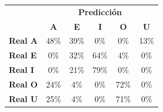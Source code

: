 \begin{tabular}{lccccc}
\toprule
 & \multicolumn{5}{c}{\textbf{Predicción}} \\
 & \textbf{A} & \textbf{E} & \textbf{I} & \textbf{O} & \textbf{U} \\
\midrule
\textbf{Real A} & \cellcolor[rgb]{0.67,0.67,1.00}  48\% & \cellcolor[rgb]{0.73,0.73,1.00}  39\% & \cellcolor[rgb]{1.00,1.00,1.00}  0\% & \cellcolor[rgb]{1.00,1.00,1.00}  0\% & \cellcolor[rgb]{0.91,0.91,1.00}  13\% \\
\textbf{Real E} & \cellcolor[rgb]{1.00,1.00,1.00}  0\% & \cellcolor[rgb]{0.78,0.78,1.00}  32\% & \cellcolor[rgb]{0.55,0.55,1.00} \color{white} 64\% & \cellcolor[rgb]{0.97,0.97,1.00}  4\% & \cellcolor[rgb]{1.00,1.00,1.00}  0\% \\
\textbf{Real I} & \cellcolor[rgb]{1.00,1.00,1.00}  0\% & \cellcolor[rgb]{0.85,0.85,1.00}  21\% & \cellcolor[rgb]{0.45,0.45,1.00} \color{white} 79\% & \cellcolor[rgb]{1.00,1.00,1.00}  0\% & \cellcolor[rgb]{1.00,1.00,1.00}  0\% \\
\textbf{Real O} & \cellcolor[rgb]{0.83,0.83,1.00}  24\% & \cellcolor[rgb]{0.97,0.97,1.00}  4\% & \cellcolor[rgb]{1.00,1.00,1.00}  0\% & \cellcolor[rgb]{0.50,0.50,1.00} \color{white} 72\% & \cellcolor[rgb]{1.00,1.00,1.00}  0\% \\
\textbf{Real U} & \cellcolor[rgb]{0.82,0.82,1.00}  25\% & \cellcolor[rgb]{0.97,0.97,1.00}  4\% & \cellcolor[rgb]{1.00,1.00,1.00}  0\% & \cellcolor[rgb]{0.50,0.50,1.00} \color{white} 71\% & \cellcolor[rgb]{1.00,1.00,1.00}  0\% \\
\bottomrule
\end{tabular}